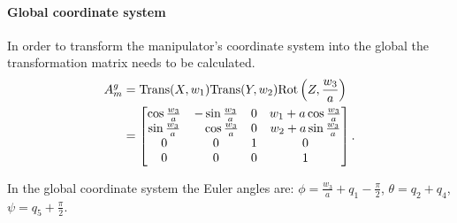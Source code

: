 \paragraph{Global coordinate system}
In order to transform the manipulator's coordinate system into the global the transformation matrix needs to be calculated.
\begin{equation}
\begin{aligned}
A_m^g&=\mathrm{Trans}(X, w_1)\mathrm{Trans}(Y, w_2)\mathrm{Rot}\left(Z, \frac{w_3}{a}\right)\\
&= \begin{bmatrix}
\cos \frac{w_3}{a} & -\sin \frac{w_3}{a} & 0 & w_1+a\cos \frac{w_3}{a}\\
\sin \frac{w_3}{a} & \phantom{-}\cos \frac{w_3}{a} & 0 & w_2+a\sin \frac{w_3}{a}\\
0 & 0 & 1 & 0\\
0 & 0 & 0 & 1
\end{bmatrix}.
\end{aligned}
\end{equation}

In the global coordinate system the Euler angles are: $\phi=\frac{w_3}{a}+q_1-\frac{\pi}{2}$, $\theta=q_2+q_4$, $\psi=q_5+\frac{\pi}{2}$.
